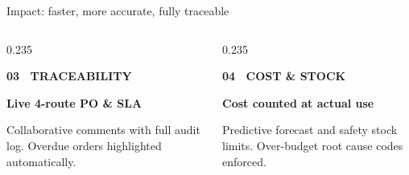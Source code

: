 \begin{frame}{Impact: faster, more accurate, fully traceable}
\begin{columns}[T]
        \begin{column}{0.235\textwidth}
            \begin{minimalcard}[height=4.8cm]
                {\fontsize{7}{8.5}\bfseries\selectfont\color{primary}03 \textbullet\ TRACEABILITY}\par
                \vspace{6pt}
                {\fontsize{8.5}{11}\bfseries\selectfont\color{darkslate}Live 4-route PO \& SLA}\par
                \vspace{8pt}
                {\fontsize{7.5}{10}\selectfont\color{mutedgray}
                Collaborative comments with full audit log. Overdue orders highlighted automatically.
                }
            \end{minimalcard}
        \end{column}
        
        \begin{column}{0.235\textwidth}
            \begin{minimalcard}[height=4.8cm]
                {\fontsize{7}{8.5}\bfseries\selectfont\color{primary}04 \textbullet\ COST \& STOCK}\par
                \vspace{6pt}
                {\fontsize{8.5}{11}\bfseries\selectfont\color{darkslate}Cost counted at actual use}\par
                \vspace{8pt}
                {\fontsize{7.5}{10}\selectfont\color{mutedgray}
                Predictive forecast and safety stock limits. Over-budget root cause codes enforced.
                }
            \end{minimalcard}
        \end{column}
    \end{columns}
\end{frame}
